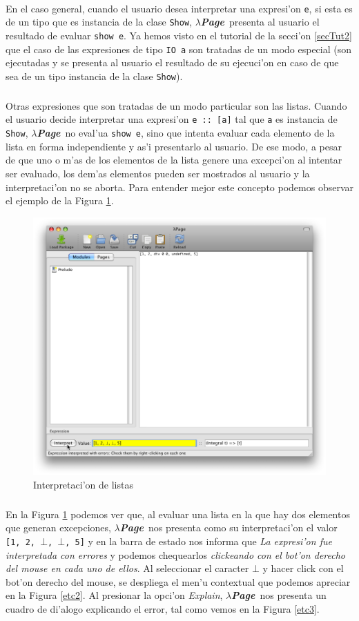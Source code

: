 \documentclass[a4paper]{article}
\newcommand{\hpage}{\textbf{\textsl{$\lambda$Page}}}
\begin{document}
\paragraph{}En el caso general, cuando el usuario desea interpretar una expresi'on \texttt{e}, si esta es de un tipo que es instancia de la clase \texttt{Show}, \hpage\ presenta al usuario el resultado de evaluar \texttt{show e}.  Ya hemos visto en el tutorial de la secci'on \ref{secTut2} que el caso de las expresiones de tipo \texttt{IO a} son tratadas de un modo especial (son ejecutadas y se presenta al usuario el resultado de su ejecuci'on en caso de que sea de un tipo instancia de la clase \texttt{Show}).
\subparagraph{}Otras expresiones que son tratadas de un modo particular son las listas.  Cuando el usuario decide interpretar una expresi'on \texttt{e :: [a]} tal que \texttt{a} es instancia de \texttt{Show}, \hpage\ no eval'ua \texttt{show e}, sino que intenta evaluar cada elemento de la lista en forma independiente y as'i presentarlo al usuario.  De ese modo, a pesar de que uno o m'as de los elementos de la lista genere una excepci'on al intentar ser evaluado, los dem'as elementos pueden ser mostrados al usuario y la interpretaci'on no se aborta.  Para entender mejor este concepto podemos observar el ejemplo de la Figura \ref{etc1}.
\begin{figure}[hp]
	\begin{center}
        	\includegraphics[width=.75\textwidth]{pictures/lists01}
		\caption{Interpretaci'on de listas}
		\label{etc1}
	\end{center}
\end{figure}
\subparagraph{}En la Figura \ref{etc1} podemos ver que, al evaluar una lista en la que hay dos elementos que generan excepciones, \hpage\ nos presenta como su interpretaci'on el valor \texttt{[1, 2, $\bot$, $\bot$, 5]} y en la barra de estado nos informa que \textit{La expresi'on fue interpretada con errores} y podemos chequearlos \textit{clickeando con el bot'on derecho del mouse en cada uno de ellos}.  Al seleccionar el caracter \texttt{$\bot$} y hacer click con el bot'on derecho del mouse, se despliega el men'u contextual que podemos apreciar en la Figura \ref{etc2}. Al presionar la opci'on \textsl{Explain}, \hpage\ nos presenta un cuadro de di'alogo explicando el error, tal como vemos en la Figura \ref{etc3}.
\end{document}
